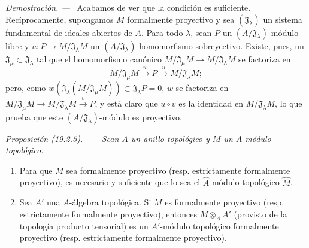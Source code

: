 \documentclass[10pt,oneside]{book}
\makeatletter
\newcommand{\setmanualcurrentlabel}[1]{\def\@currentlabel{#1}}
\newenvironment{proposition}[1][]{%
  \setmanualcurrentlabel{#1}\par\medskip\noindent\itshape Proposición (#1). ---\ }{\par}
\newenvironment{proof}{%
  \par\medskip\noindent\textit{Demostración. ---\ }}{\par}
\makeatother
\begin{document}
\begin{proof}
Acabamos de ver que la condición es suficiente. Recíprocamente, supongamos $M$
formalmente proyectivo y sea $(\mathfrak J_\lambda)$ un sistema fundamental
de ideales abiertos de $A$. Para todo $\lambda$, sean $P$ un
$(A/\mathfrak J_\lambda)$-módulo libre y
$u:P\to M/\mathfrak J_\lambda M$ un
$(A/\mathfrak J_\lambda)$-homomorfismo sobreyectivo. Existe, pues, un
$\mathfrak J_\mu\subset\mathfrak J_\lambda$ tal que el homomorfismo canónico
$M/\mathfrak J_\mu M\to M/\mathfrak J_\lambda M$ se factoriza en
\[
  M/\mathfrak J_\mu M\xrightarrow{w}P\xrightarrow{u}M/\mathfrak J_\lambda M;
\]
pero, como
$w(\mathfrak J_\lambda(M/\mathfrak J_\mu M))\subset\mathfrak J_\lambda P=0$,
$w$ se factoriza en $M/\mathfrak J_\mu M\to M/\mathfrak J_\lambda M\xrightarrow{v}P$, y está
claro que $u\circ v$ es la identidad en $M/\mathfrak J_\lambda M$, lo que
prueba que este $(A/\mathfrak J_\lambda)$-módulo es proyectivo.
\end{proof}

\begin{proposition}[19.2.5]
\label{0.19.2.5-es}
Sean $A$ un anillo topológico y $M$ un $A$-módulo topológico.
\begin{enumerate}
  \item[\textup{(i)}] Para que $M$ sea formalmente proyectivo \textup{(resp.} estrictamente
  formalmente proyectivo\textup{)}, es necesario y suficiente que lo sea el
  $\hat A$-módulo topológico $\hat M$.
  \item[\textup{(ii)}] Sea $A'$ una $A$-álgebra topológica. Si $M$ es formalmente
  proyectivo \textup{(resp.} estrictamente formalmente proyectivo\textup{)}, entonces
  $M\otimes_A A'$ (provisto de la topología producto tensorial) es un
  $A'$-módulo topológico formalmente proyectivo \textup{(resp.} estrictamente formalmente
  proyectivo\textup{)}.
\end{enumerate}
\end{proposition}
\end{document}
